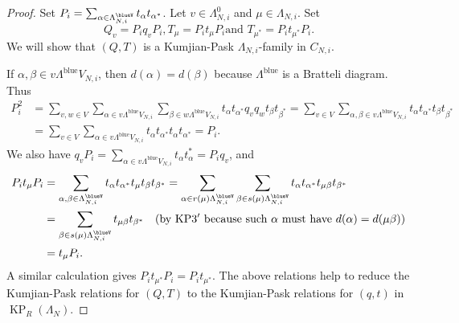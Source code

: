 \documentclass[a4paper,12pt]{amsart}
\numberwithin{equation}{section}
\theoremstyle{definition}
\theoremstyle{remark}
\begin{document}
\begin{proof} Set $P_{{{i}}}=\sum_{\alpha\in\Lambda^\blueV_{N,i}} t_\alpha t_{\alpha^*}$.   
Let $v\in \Lambda_{N,i}^0$ and $\mu \in  \Lambda_{N,i}$. 
Set \[Q_v=P_iq_v P_i, T_\mu=P_i t_\mu P_i \text {and } T_{\mu^*}=P_i t_{\mu^*} P_i.\] 
We will show  that $(Q,T)$ is a Kumjian-Pask $\Lambda_{N,i}$-family in $C_{N,i}$. 

If $\alpha,\beta\in v\Lambda^{{\operatorname{\mathrm{blue}}}} V_{N,i}$, then $d(\alpha)=d(\beta)$ because $\Lambda^{{\operatorname{\mathrm{blue}}}}$ is a Bratteli diagram.
Thus
\begin{align*}
P_i^2&=\sum_{v,w \in V}\sum_{\alpha\in v\Lambda^{{\operatorname{\mathrm{blue}}}} V_{N,i}}\sum_{\beta\in w\Lambda^{{\operatorname{\mathrm{blue}}}} V_{N,i}}t_\alpha t_{\alpha^*}q_v q_w t_\beta t_{\beta^*}
=\sum_{v \in V}\sum_{\alpha,\beta\in v\Lambda^{{\operatorname{\mathrm{blue}}}} V_{N,i}}t_\alpha t_{\alpha^*}t_\beta t_{\beta^*}\\
&=\sum_{v \in V}\sum_{\alpha\in v\Lambda^{{\operatorname{\mathrm{blue}}}} V_{N,i}}t_\alpha t_{\alpha^*}t_\alpha t_{\alpha^*}=P_i.
\end{align*}
We also have $q_vP_i=\sum_{\alpha\in v\Lambda^{{\operatorname{\mathrm{blue}}}} V_{N,i}}t_\alpha t_\alpha^*=P_i q_v$, and 
\begin{align*}
P_it_\mu P_i&=\sum_{\alpha,\beta\in\Lambda^\blueV_{N,i}} t_\alpha t_{\alpha^*}t_\mu t_\beta t_{\beta^*}
=\sum_{\alpha\in r(\mu)\Lambda^\blueV_{N,i}}\sum_{\beta\in s(\mu)\Lambda^\blueV_{N,i}} t_\alpha t_{\alpha^*}t_{\mu \beta} t_{\beta^*}\\
&=\sum_{\beta\in s(\mu)\Lambda^\blueV_{N,i}} t_{\mu \beta} t_{\beta^*}
\quad\text{(by KP3$'$ because such $\alpha$ must have $d(\alpha)=d(\mu\beta)$)}\\
&=t_\mu P_i.
\end{align*} 
A similar calculation gives $P_it_{\mu^*} P_i=P_it_{\mu^*}$. The above relations help to reduce the Kumjian-Pask relations for $(Q,T)$ to the Kumjian-Pask relations for $(q,t)$ in $\operatorname{KP}_R(\Lambda_N)$.


\end{proof}
\end{document}
